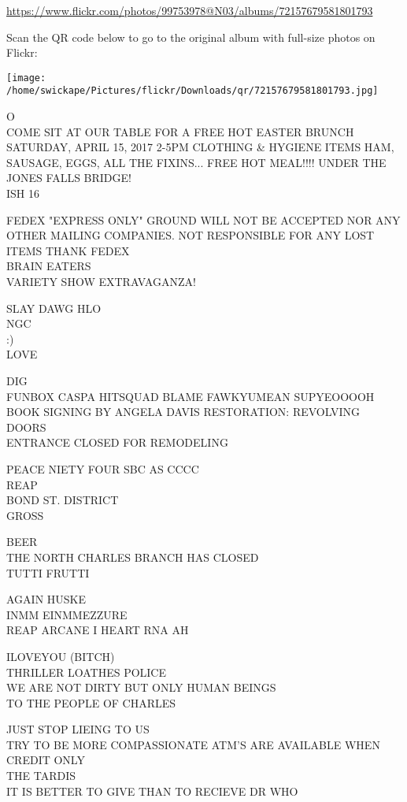 \documentclass[10pt,letterpaper]{article}
\begin{document}
\url{https://www.flickr.com/photos/99753978@N03/albums/72157679581801793}

Scan the QR code below to go to the original album with full-size photos on Flickr:

\texttt{[image: /home/swickape/Pictures/flickr/Downloads/qr/72157679581801793.jpg]}
\pagebreak

O\\
COME SIT AT OUR TABLE FOR A FREE HOT EASTER BRUNCH SATURDAY, APRIL 15, 2017 2{-}5PM CLOTHING \& HYGIENE ITEMS HAM, SAUSAGE, EGGS, ALL THE FIXINS... FREE HOT MEAL!!!! UNDER THE JONES FALLS BRIDGE!\\
ISH 16

FEDEX "EXPRESS ONLY" GROUND WILL NOT BE ACCEPTED NOR ANY OTHER MAILING COMPANIES.  NOT RESPONSIBLE FOR ANY LOST ITEMS THANK FEDEX\\
BRAIN EATERS\\
VARIETY SHOW EXTRAVAGANZA!

SLAY DAWG HLO\\
NGC\\
:)\\
LOVE

DIG\\
FUNBOX CASPA HITSQUAD BLAME FAWKYUMEAN SUPYEOOOOH\\
BOOK SIGNING BY ANGELA DAVIS RESTORATION: REVOLVING DOORS\\
ENTRANCE CLOSED FOR REMODELING

PEACE NIETY FOUR SBC AS CCCC\\
REAP\\
BOND ST. DISTRICT\\
GROSS

BEER\\
THE NORTH CHARLES BRANCH HAS CLOSED\\
TUTTI FRUTTI

AGAIN HUSKE\\
INMM EINMMEZZURE\\
REAP ARCANE I HEART RNA AH

ILOVEYOU (BITCH)\\
THRILLER LOATHES POLICE\\
WE ARE NOT DIRTY BUT ONLY HUMAN BEINGS\\
TO THE PEOPLE OF CHARLES

JUST STOP LIEING TO US\\
TRY TO BE MORE COMPASSIONATE ATM'S ARE AVAILABLE WHEN CREDIT ONLY\\
THE TARDIS\\
IT IS BETTER TO GIVE THAN TO RECIEVE DR WHO
\end{document}
